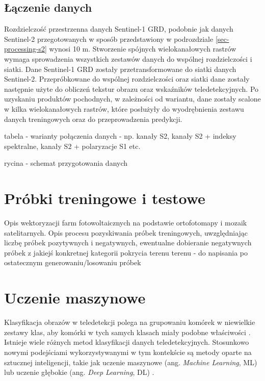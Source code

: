 \documentclass{amuthesis}
\begin{document}
\hypertarget{sec-processing-data-merging}{%
\subsection{Łączenie danych}\label{sec-processing-data-merging}}

Rozdzielczość przestrzenna danych Sentinel-1 GRD, podobnie jak danych
Sentinel-2 przegotowanych w sposób przedstawiony w podrozdziale
\ref{sec-processing-s2} wynosi 10 m. Stworzenie spójnych wielokanałowych
rastrów wymaga sprowadzenia wszystkich zestawów danych do wspólnej
rozdzielczości i siatki. Dane Sentinel-1 GRD zostały przetransformowane
do siatki danych Sentinel-2. Przepróbkowane do wspólnej rozdzielczości
oraz siatki dane zostały następnie użyte do obliczeń tekstur obrazu oraz
wskaźników teledetekcyjnych. Po uzyskaniu produktów pochodnych, w
zależności od wariantu, dane zostały scalone w kilka wielokanałowych
rastrów, które posłużyły do wyodrębnienia zestawu danych treningowych
oraz do przeprowadzenia predykcji.

tabela - warianty połączenia danych - np. kanały S2, kanały S2 + indeksy
spektralne, kanały S2 + polaryzacje S1 etc.

rycina - schemat przygotowania danych

\hypertarget{sec-samples-methods}{%
\section{Próbki treningowe i testowe}\label{sec-samples-methods}}

Opis wektoryzacji farm fotowoltaicznych na podstawie ortofotomapy i
mozaik satelitarnych. Opis procesu pozyskiwania próbek treningowych,
uwzględniając liczbę próbek pozytywnych i negatywnych, ewentualne
dobieranie negatywnych próbek z jakiejś konkretnej kategorii pokrycia
terenu terenu - do napisania po ostatecznym generowaniu/losowaniu próbek

\hypertarget{sec-machine-learning}{%
\section{Uczenie maszynowe}\label{sec-machine-learning}}

Klasyfikacja obrazów w teledetekcji polega na grupowaniu komórek w
niewielkie zestawy klas, aby komórki w tych samych klasach miały podobne
właściwości \autocite{ismail_2009_classification}. Istnieje wiele
różnych metod klasyfikacji danych teledetekcyjnych. Stosunkowo nowymi
podejściami wykorzystywanymi w tym kontekście są metody oparte na
sztucznej inteligencji, takie jak uczenie maszynowe (ang. \emph{Machine
Learning}, ML) lub uczenie głębokie (ang. \emph{Deep Learning}, DL)
\autocite{hejmanowska_2020_dane}.
\end{document}
